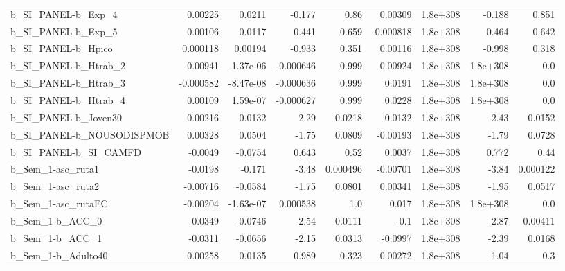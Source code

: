 \begin{tabular}{lrrrrrrrr}
b\_SI\_PANEL-b\_Exp\_4           &     0.00225 &       0.0211 &    -0.177 &     0.86 &    0.00309 &    1.8e+308 &       -0.188 &         0.851 \\
b\_SI\_PANEL-b\_Exp\_5           &     0.00106 &       0.0117 &     0.441 &    0.659 &  -0.000818 &    1.8e+308 &        0.464 &         0.642 \\
b\_SI\_PANEL-b\_Hpico           &    0.000118 &      0.00194 &    -0.933 &    0.351 &    0.00116 &    1.8e+308 &       -0.998 &         0.318 \\
b\_SI\_PANEL-b\_Htrab\_2         &    -0.00941 &    -1.37e-06 & -0.000646 &    0.999 &    0.00924 &    1.8e+308 &     1.8e+308 &           0.0 \\
b\_SI\_PANEL-b\_Htrab\_3         &   -0.000582 &    -8.47e-08 & -0.000636 &    0.999 &     0.0191 &    1.8e+308 &     1.8e+308 &           0.0 \\
b\_SI\_PANEL-b\_Htrab\_4         &     0.00109 &     1.59e-07 & -0.000627 &    0.999 &     0.0228 &    1.8e+308 &     1.8e+308 &           0.0 \\
b\_SI\_PANEL-b\_Joven30         &     0.00216 &       0.0132 &      2.29 &   0.0218 &     0.0132 &    1.8e+308 &         2.43 &        0.0152 \\
b\_SI\_PANEL-b\_NOUSODISPMOB    &     0.00328 &       0.0504 &     -1.75 &   0.0809 &   -0.00193 &    1.8e+308 &        -1.79 &        0.0728 \\
b\_SI\_PANEL-b\_SI\_CAMFD        &     -0.0049 &      -0.0754 &     0.643 &     0.52 &     0.0037 &    1.8e+308 &        0.772 &          0.44 \\
b\_Sem\_1-asc\_ruta1            &     -0.0198 &       -0.171 &     -3.48 & 0.000496 &   -0.00701 &    1.8e+308 &        -3.84 &      0.000122 \\
b\_Sem\_1-asc\_ruta2            &    -0.00716 &      -0.0584 &     -1.75 &   0.0801 &    0.00341 &    1.8e+308 &        -1.95 &        0.0517 \\
b\_Sem\_1-asc\_rutaEC           &    -0.00204 &    -1.63e-07 &  0.000538 &      1.0 &      0.017 &    1.8e+308 &     1.8e+308 &           0.0 \\
b\_Sem\_1-b\_ACC\_0              &     -0.0349 &      -0.0746 &     -2.54 &   0.0111 &       -0.1 &    1.8e+308 &        -2.87 &       0.00411 \\
b\_Sem\_1-b\_ACC\_1              &     -0.0311 &      -0.0656 &     -2.15 &   0.0313 &    -0.0997 &    1.8e+308 &        -2.39 &        0.0168 \\
b\_Sem\_1-b\_Adulto40           &     0.00258 &       0.0135 &     0.989 &    0.323 &    0.00272 &    1.8e+308 &         1.04 &           0.3 \\

\end{tabular}
